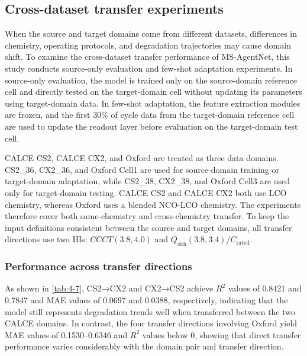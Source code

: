 
\clearpage

\FloatBarrier
\clearpage

\subsection{Cross-dataset transfer experiments}

When the source and target domains come from different datasets, differences in chemistry, operating protocols, and degradation trajectories may cause domain shift\cite{ref52,ref59}. To examine the cross-dataset transfer performance of MS-AgentNet, this study conducts source-only evaluation and few-shot adaptation experiments. In source-only evaluation, the model is trained only on the source-domain reference cell and directly tested on the target-domain cell without updating its parameters using target-domain data. In few-shot adaptation, the feature extraction modules are frozen, and the first 30\% of cycle data from the target-domain reference cell are used to update the readout layer before evaluation on the target-domain test cell\cite{ref52,ref58}.

CALCE CS2, CALCE CX2, and Oxford are treated as three data domains. CS2\_36, CX2\_36, and Oxford Cell1 are used for source-domain training or target-domain adaptation, while CS2\_38, CX2\_38, and Oxford Cell3 are used only for target-domain testing. CALCE CS2 and CALCE CX2 both use LCO chemistry, whereas Oxford uses a blended NCO-LCO chemistry. The experiments therefore cover both same-chemistry and cross-chemistry transfer. To keep the input definitions consistent between the source and target domains, all transfer directions use two HIs: $CCCT(3.8,\allowbreak 4.0)$ and $Q_{\mathrm{dch}}(3.8,\allowbreak 3.4)/C_{\mathrm{rated}}$.

\subsubsection{Performance across transfer directions}

As shown in \cref{tab:4-7}, CS2→CX2 and CX2→CS2 achieve $R^2$ values of 0.8421 and 0.7847 and MAE values of 0.0697 and 0.0388, respectively, indicating that the model still represents degradation trends well when transferred between the two CALCE domains. In contrast, the four transfer directions involving Oxford yield MAE values of 0.1530–0.6346 and $R^2$ values below 0, showing that direct transfer performance varies considerably with the domain pair and transfer direction.

